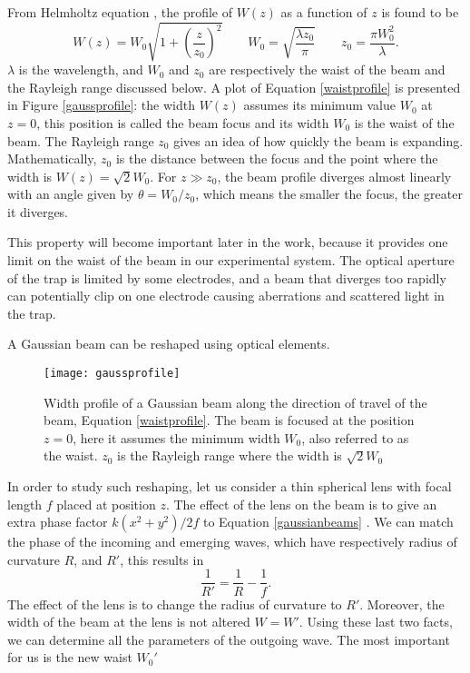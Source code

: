 From Helmholtz equation \cite{saleh}, the profile of $W(z)$ as a function of $z$ is found to be
\begin{equation}
\label{waistprofile}
W(z) = W_0 \sqrt{1 + \left(\frac{z}{z_0}\right)^2}\qquad W_0 = \sqrt{\frac{\lambda z_0}{\pi}} \qquad z_0 = \frac{\pi W_0^2}{\lambda}.
\end{equation}
$\lambda$ is the wavelength, and $W_0$ and $z_0$ are respectively the waist of the beam and the Rayleigh range discussed below. A plot of Equation \eqref{waistprofile} is presented in Figure \eqref{gaussprofile}:
the width $W(z)$ assumes its minimum value $W_0$ at $z=0$, this position is called the beam focus and its width $W_0$ is the waist of the beam. The Rayleigh range $z_0$ gives an idea of how quickly the beam is expanding. Mathematically, $z_0$ is the distance between the focus and the point where the width is $W(z) = \sqrt{2}W_0$.
For $z \gg z_0$, the beam profile diverges almost linearly with an angle given by $\theta = W_0/z_0$, which means the smaller the focus, the greater it diverges.\par
This property will become important later in the work, because it provides one limit on the waist of the beam in our experimental system. The optical aperture of the trap is limited by some electrodes, and a beam that diverges too rapidly can potentially clip on one electrode causing aberrations and scattered light in the trap.\par
A Gaussian beam can be reshaped using optical elements.
\begin{figure}
\centering
\texttt{[image: gaussprofile]}
\caption{Width profile of a Gaussian beam along the direction of travel of the beam, Equation \eqref{waistprofile}. The beam is focused at the position $z = 0$, here it assumes the minimum width $W_0$, also referred to as the waist. $z_0$ is the Rayleigh range where the width is $\sqrt{2}W_0$}
\label{gaussprofile}
\end{figure}
In order to study such reshaping, let us consider a thin spherical lens with focal length $f$ placed at position $z$. The effect of the lens on the beam is to give an extra phase factor $k(x^2 + y^2)/2f$ to Equation \eqref{gaussianbeams} \cite{beamparameters}. We can match the phase of the incoming and emerging waves, which have respectively radius of curvature $R$, and $R'$, this results in
\begin{equation}
\frac{1}{R'} = \frac{1}{R} - \frac{1}{f}.
\end{equation}
The effect of the lens is to change the radius of curvature to $R'$. Moreover, the width of the beam at the lens is not altered $W=W'$. Using these last two facts, we can determine all the parameters of the outgoing wave. The most important for us is the new waist $W_0'$
